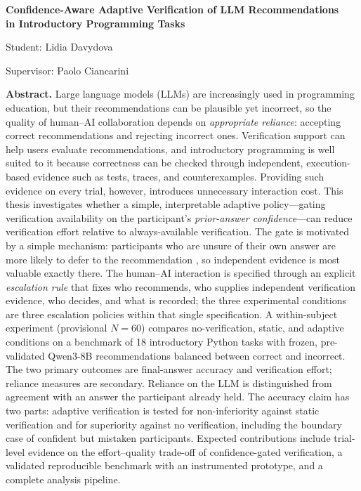 \documentclass[oneside,final,14pt,a4paper]{extreport}
\begin{document}
\begingroup
\setlength{\parindent}{0pt}
\setlength{\parskip}{0pt}

\begin{center}
    {\Large\bfseries
    Confidence-Aware Adaptive Verification of LLM Recommendations\\
    in Introductory Programming Tasks\par}
    \vspace{0.5em}
    {\normalsize Student: Lidia Davydova\par}
    \vspace{0.15em}
    {\normalsize Supervisor: Paolo Ciancarini\par}
\end{center}

\vspace{0.5em}

\begingroup
\small
\begin{minipage}{0.9\textwidth}
\noindent\textbf{Abstract.}
Large language models (LLMs) are increasingly used in programming
education, but their recommendations can be plausible yet incorrect,
so the quality of human--AI collaboration depends on
\emph{appropriate reliance}: accepting correct recommendations and
rejecting incorrect ones. Verification support can help users evaluate
recommendations, and introductory programming is well suited to it
because correctness can be checked through independent, execution-based
evidence such as tests, traces, and counterexamples. Providing such
evidence on every trial, however, introduces unnecessary interaction
cost. This thesis investigates whether a simple, interpretable adaptive
policy---gating verification availability on the participant's
\emph{prior-answer confidence}---can reduce verification effort relative to
always-available verification. The gate is motivated by a simple mechanism:
participants who are unsure of their own answer are more likely to defer to
the recommendation \cite{YanivKleinberger2000}, so independent evidence is
most valuable exactly there.
The human--AI interaction is specified through an explicit \emph{escalation
rule} that fixes who recommends, who supplies independent verification
evidence, who decides, and what is recorded; the three experimental
conditions are three escalation policies within that single specification. A
within-subject experiment (provisional $N=60$) compares no-verification,
static, and adaptive conditions on a benchmark of 18 introductory Python
tasks with frozen, pre-validated Qwen3-8B recommendations balanced between
correct and incorrect. The two primary outcomes are final-answer accuracy and
verification effort; reliance measures are secondary. Reliance on the LLM is
distinguished from agreement with an answer the participant already held.
The accuracy claim has two parts: adaptive verification is tested for
non-inferiority against static verification and for superiority against no
verification, including the boundary case of confident but mistaken
participants. Expected contributions include trial-level evidence on the
effort--quality trade-off of confidence-gated verification, a validated
reproducible benchmark with an instrumented prototype, and a complete
analysis pipeline.
\end{minipage}
\endgroup
\end{document}
